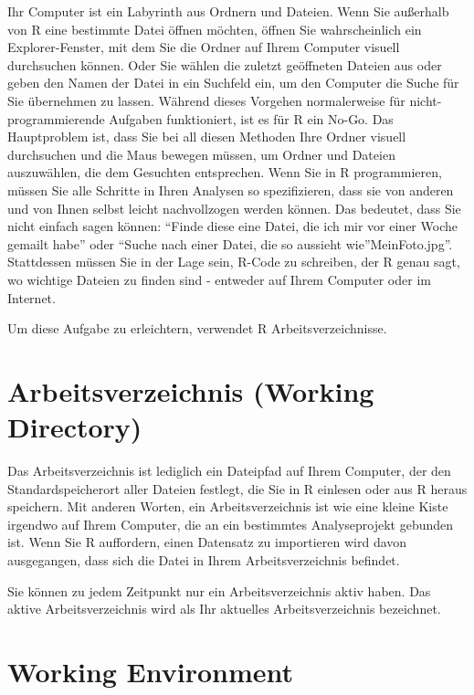 \documentclass[
]{book}
\begin{document}
Ihr Computer ist ein Labyrinth aus Ordnern und Dateien. Wenn Sie außerhalb von R eine bestimmte Datei öffnen möchten, öffnen Sie wahrscheinlich ein Explorer-Fenster, mit dem Sie die Ordner auf Ihrem Computer visuell durchsuchen können. Oder Sie wählen die zuletzt geöffneten Dateien aus oder geben den Namen der Datei in ein Suchfeld ein, um den Computer die Suche für Sie übernehmen zu lassen. Während dieses Vorgehen normalerweise für nicht-programmierende Aufgaben funktioniert, ist es für R ein No-Go. Das Hauptproblem ist, dass Sie bei all diesen Methoden Ihre Ordner visuell durchsuchen und die Maus bewegen müssen, um Ordner und Dateien auszuwählen, die dem Gesuchten entsprechen. Wenn Sie in R programmieren, müssen Sie alle Schritte in Ihren Analysen so spezifizieren, dass sie von anderen und von Ihnen selbst leicht nachvollzogen werden können. Das bedeutet, dass Sie nicht einfach sagen können: ``Finde diese eine Datei, die ich mir vor einer Woche gemailt habe'' oder ``Suche nach einer Datei, die so aussieht wie''MeinFoto.jpg''. Stattdessen müssen Sie in der Lage sein, R-Code zu schreiben, der R genau sagt, wo wichtige Dateien zu finden sind - entweder auf Ihrem Computer oder im Internet.

Um diese Aufgabe zu erleichtern, verwendet R Arbeitsverzeichnisse.

\hypertarget{arbeitsverzeichnis-working-directory}{%
\section{Arbeitsverzeichnis (Working Directory)}\label{arbeitsverzeichnis-working-directory}}

Das Arbeitsverzeichnis ist lediglich ein Dateipfad auf Ihrem Computer, der den Standardspeicherort aller Dateien festlegt, die Sie in R einlesen oder aus R heraus speichern. Mit anderen Worten, ein Arbeitsverzeichnis ist wie eine kleine Kiste irgendwo auf Ihrem Computer, die an ein bestimmtes Analyseprojekt gebunden ist. Wenn Sie R auffordern, einen Datensatz zu importieren wird davon ausgegangen, dass sich die Datei in Ihrem Arbeitsverzeichnis befindet.

Sie können zu jedem Zeitpunkt nur ein Arbeitsverzeichnis aktiv haben. Das aktive Arbeitsverzeichnis wird als Ihr aktuelles Arbeitsverzeichnis bezeichnet.

\hypertarget{working-environment}{%
\section{Working Environment}\label{working-environment}}
\end{document}
